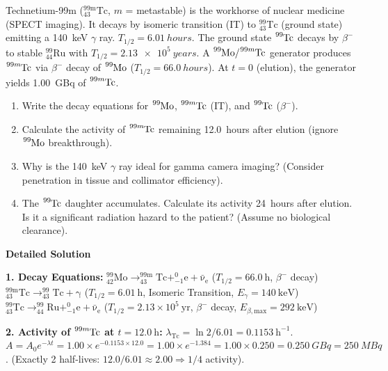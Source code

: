 \documentclass[11pt]{article}
\begin{document}
\begin{exoresolu}
Technetium-99m ($\ensuremath{\mathrm{^{99m}_{43}Tc}}$, $m$ = metastable) is the workhorse of nuclear medicine (SPECT imaging). It decays by isomeric transition (IT) to $\ensuremath{\mathrm{^{99}_{43}Tc}}$ (ground state) emitting a \SI{140}{keV} $\gamma$ ray. $T_{1/2} = \SI{6.01}{hours}$. The ground state $\ce{^{99}Tc}$ decays by $\beta^-$ to stable $\ensuremath{\mathrm{^{99}_{44}Ru}}$ with $T_{1/2} = \SI{2.13e5}{years}$.
A $\ce{^{99}Mo}/\ce{^{99m}Tc}$ generator produces $\ce{^{99m}Tc}$ via $\beta^-$ decay of $\ce{^{99}Mo}$ ($T_{1/2} = \SI{66.0}{hours}$). At $t=0$ (elution), the generator yields \SI{1.00}{GBq} of $\ce{^{99m}Tc}$.
\begin{enumerate}
\item Write the decay equations for $\ce{^{99}Mo}$, $\ce{^{99m}Tc}$ (IT), and $\ce{^{99}Tc}$ ($\beta^-$).
\item Calculate the activity of $\ce{^{99m}Tc}$ remaining \SI{12.0}{hours} after elution (ignore $\ce{^{99}Mo}$ breakthrough).
\item Why is the \SI{140}{keV} $\gamma$ ray ideal for gamma camera imaging? (Consider penetration in tissue and collimator efficiency).
\item The $\ce{^{99}Tc}$ daughter accumulates. Calculate its activity \SI{24}{hours} after elution. Is it a significant radiation hazard to the patient? (Assume no biological clearance).
\end{enumerate}
\tcblower
\textbf{Detailed Solution}

\textbf{1. Decay Equations:}
$\ensuremath{\mathrm{^{99}_{42}Mo \rightarrow  ^{99m}_{43}Tc + ^{0}_{-1}e + \bar{\nu}_e}}$ \quad ($T_{1/2}=66.0\ \text{h}$, $\beta^-$ decay)
$\ensuremath{\mathrm{^{99m}_{43}Tc \rightarrow  ^{99}_{43}Tc + \gamma}}$ \quad ($T_{1/2}=6.01\ \text{h}$, Isomeric Transition, $E_\gamma=140\ \text{keV}$)
$\ensuremath{\mathrm{^{99}_{43}Tc \rightarrow  ^{99}_{44}Ru + ^{0}_{-1}e + \bar{\nu}_e}}$ \quad ($T_{1/2}=2.13\times 10^5\ \text{yr}$, $\beta^-$ decay, $E_{\beta,\text{max}}=292\ \text{keV}$)

\textbf{2. Activity of $\ce{^{99m}Tc}$ at $t=12.0\ \text{h}$:}
$\lambda_{\text{Tc}} = \ln 2 / 6.01 = 0.1153\ \text{h}^{-1}$.
$A = A_0 e^{-\lambda t} = 1.00 \times e^{-0.1153 \times 12.0} = 1.00 \times e^{-1.384} = 1.00 \times 0.250 = \SI{0.250}{GBq} = \SI{250}{MBq}$.
(Exactly 2 half-lives: $12.0 / 6.01 \approx 2.00 \Rightarrow 1/4$ activity).


\end{exoresolu}
\end{document}
